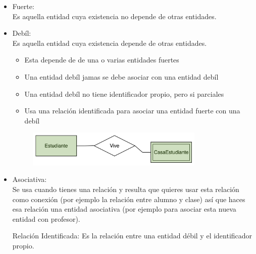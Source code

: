 \documentclass[12pt, fleqn]{report}                             %
\begin{document}
                \begin{itemize}
                    \item Fuerte:\\
                        Es aquella entidad cuya existencia no depende de otras entidades.
                    \item 
                        Debíl:\\
                        Es aquella entidad cuya existencia depende de otras entidades.
                        \begin{itemize}
                            \item Esta depende de de una o varias entidades fuertes
                            \item Una entidad debíl jamas se debe asociar con una entidad debíl
                            \item Una entidad debíl no tiene identificador propio, pero si parciales
                            \item Usa una relación identificada para asociar una entidad fuerte con una debíl
                        \end{itemize}

                        \begin{figure}[h]
                            \centering
                            \includegraphics[width=0.80\textwidth]{EjemploEntidadDebil}
                        \end{figure}

                    \clearpage

                    \item Asociativa: \\
                        Se usa cuando tienes una relación y resulta que quieres usar esta relación
                        como conexión (por ejemplo la relación entre alumno y clase) así que haces
                        esa relación una entidad asociativa (por ejemplo para asociar esta nueva
                        entidad con profesor).

                        Relación Identificada: Es la relación entre una entidad débil y el
                        identificador propio.


\end{itemize}
\end{document}
